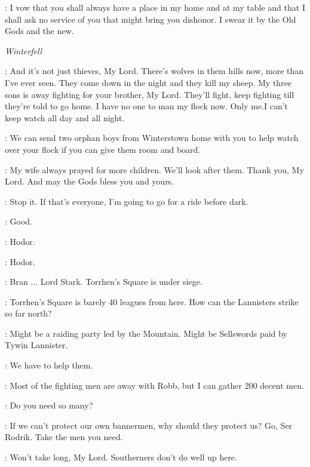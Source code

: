 
\CATELYN: I vow that you shall always have a place in my home and at my table and that I shall ask no service of you that might bring you dishonor. I swear it by the Old Gods and the new. 



\scene

\textit{Winterfell} 


\FARMER: And it's not just thieves, My Lord. There's wolves in them hills now, more than I've ever seen. They come down in the night and they kill my sheep. My three sons is away fighting for your brother, My Lord. They'll fight, keep fighting till they're told to go home. I have no one to man my flock now. Only me.I can't keep watch all day and all night. 

\BRAN: We can send two orphan boys from Winterstown home with you to help watch over your flock if you can give them room and board. 

\FARMER: My wife always prayed for more children. We'll look after them. Thank you, My Lord. And may the Gods bless you and yours. 

\BRAN:  Stop it.  If that's everyone, I'm going to go for a ride before dark. 

\LUWIN: Good. 

\BRAN: Hodor. 

\HODOR: Hodor. 


\RODRIK: Bran $\ldots$ Lord Stark. Torrhen's Square is under siege. 

\LUWIN: Torrhen's Square is barely 40 leagues from here. How can the Lannisters strike so far north? 

\RODRIK: Might be a raiding party led by the Mountain. Might be Sellswords paid by Tywin Lannister. 

\BRAN: We have to help them. 

\RODRIK: Most of the fighting men are away with Robb, but I can gather 200 decent men. 

\LUWIN: Do you need so many? 

\BRAN: If we can't protect our own bannermen, why should they protect us? Go, Ser Rodrik. Take the men you need. 

\RODRIK: Won't take long, My Lord. Southerners don't do well up here. 


